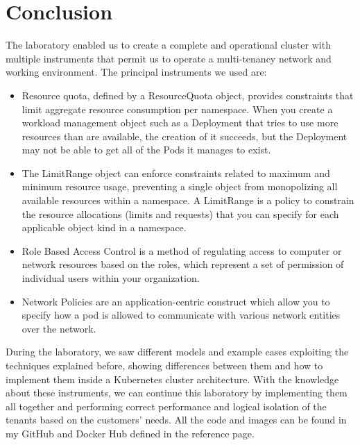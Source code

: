 \section{Conclusion}
The laboratory enabled us to create a complete and operational cluster with multiple instruments that permit us to operate a multi-tenancy network and working environment. The principal instruments we used are:
\begin{itemize}
    \item Resource quota, defined by a ResourceQuota object, provides constraints that limit aggregate resource consumption per namespace. When you create a workload management object such as a Deployment that tries to use more resources than are available, the creation of it succeeds, but the Deployment may not be able to get all of the Pods it manages to exist.
    \item The LimitRange object can enforce constraints related to maximum and minimum resource usage, preventing a single object from monopolizing all available resources within a namespace. A LimitRange is a policy to constrain the resource allocations (limits and requests) that you can specify for each applicable object kind in a namespace.
    \item Role Based Access Control is a method of regulating access to computer or network resources based on the roles, which represent a set of permission of individual users within your organization.
    \item Network Policies are an application-centric construct which allow you to specify how a pod is allowed to communicate with various network entities over the network.
\end{itemize}
During the laboratory, we saw different models and example cases exploiting the techniques explained before, showing differences between them and how to implement them inside a Kubernetes cluster architecture. With the knowledge about these instruments, we can continue this laboratory by implementing them all together and performing correct performance and logical isolation of the tenants based on the customers' needs. All the code and images can be found in my GitHub and Docker Hub defined in the reference page.
